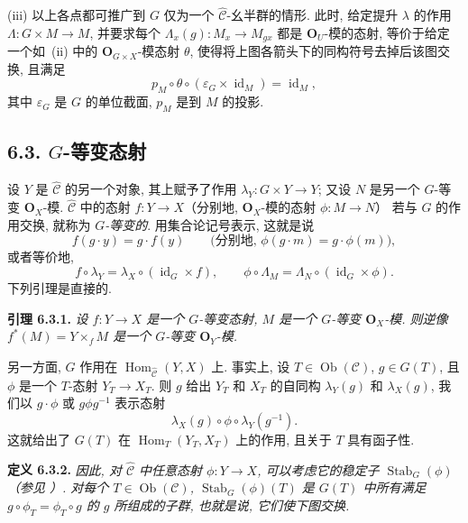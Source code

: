 (iii) 以上各点都可推广到 \(G\) 仅为一个
\(\widehat{\mathscr C}\)-幺半群的情形. 此时, 给定提升 \(\lambda\)
的作用 \(\Lambda:G\times M\to M\), 并要求每个
\(\Lambda_x(g):M_x\to M_{gx}\) 都是 \(\mathbf O_U\)-模的态射,
等价于给定一个如~(ii) 中的 \(\mathbf O_{G\times X}\)-模态射
\(\theta\), 使得将上图各箭头下的同构符号去掉后该图交换, 且满足
\[
  p_M\circ\theta\circ(\varepsilon_G\times\operatorname{id}_M)
  =\operatorname{id}_M,
\]
其中 \(\varepsilon_G\) 是 \(G\) 的单位截面, \(p_M\) 是到 \(M\) 的投影.

\subsection*{6.3. \(G\)-等变态射}

设 \(Y\) 是 \(\widehat{\mathscr C}\) 的另一个对象, 其上赋予了作用
\(\lambda_Y:G\times Y\to Y\); 又设 \(N\) 是另一个
\(G\)-等变 \(\mathbf O_X\)-模. \(\widehat{\mathscr C}\) 中的态射
\(f:Y\to X\)（分别地, \(\mathbf O_X\)-模的态射 \(\phi:M\to N\)）
若与 \(G\) 的作用交换, 就称为 \emph{\(G\)-等变的}.
用集合论记号表示, 这就是说
\[
  f(g\cdot y)=g\cdot f(y)
  \qquad
  \bigl(\text{分别地, }\phi(g\cdot m)=g\cdot\phi(m)\bigr),
\]
或者等价地,
\[
  f\circ\lambda_Y=\lambda_X\circ(\operatorname{id}_G\times f),
  \qquad
  \phi\circ\Lambda_M=\Lambda_N\circ(\operatorname{id}_G\times\phi).
\]
下列引理是直接的.

\medskip
\noindent{}\textbf{引理 6.3.1.}
\textit{设 \(f:Y\to X\) 是一个 \(G\)-等变态射, \(M\) 是一个
\(G\)-等变 \(\mathbf O_X\)-模. 则逆像
\(f^*(M)=Y\times_fM\) 是一个 \(G\)-等变
\(\mathbf O_Y\)-模.}

另一方面, \(G\) 作用在
\(\operatorname{Hom}_{\widehat{\mathscr C}}(Y,X)\) 上. 事实上, 设
\(T\in\operatorname{Ob}(\mathscr C)\), \(g\in G(T)\), 且 \(\phi\)
是一个 \(T\)-态射 \(Y_T\to X_T\). 则 \(g\) 给出 \(Y_T\) 和
\(X_T\) 的自同构 \(\lambda_Y(g)\) 和 \(\lambda_X(g)\), 我们以
\(g\cdot\phi\) 或 \(g\phi g^{-1}\) 表示态射
\[
  \lambda_X(g)\circ\phi\circ\lambda_Y(g^{-1}).
\]
这就给出了 \(G(T)\) 在
\(\operatorname{Hom}_T(Y_T,X_T)\) 上的作用, 且关于 \(T\) 具有函子性.

\medskip
\noindent{}\textbf{定义 6.3.2.}
\textit{因此, 对 \(\widehat{\mathscr C}\) 中任意态射 \(\phi:Y\to X\),
可以考虑它的稳定子 \(\operatorname{Stab}_G(\phi)\)
（参见 ）. 对每个
\(T\in\operatorname{Ob}(\mathscr C)\),
\(\operatorname{Stab}_G(\phi)(T)\) 是 \(G(T)\) 中所有满足
\(g\circ\phi_T=\phi_T\circ g\) 的 \(g\) 所组成的子群,
也就是说, 它们使下图交换.}


